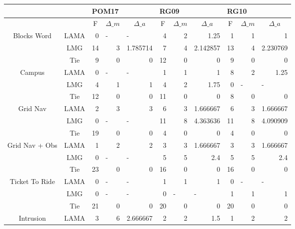 \documentclass{article}
\begin{document}
\begin{table}[htbp]
\begin{tabular}{|c|c|r|r|r|r|r|r|r|r|r|}
\hline
&&\multicolumn{3}{|l|}{POM17}&\multicolumn{3}{|l|}{RG09}&\multicolumn{3}{|l|}{RG10} \\ \hline
&\multicolumn{1}{|l|}{} & \multicolumn{1}{c|}{F} & \multicolumn{1}{c|}{$\Delta\_m$} & \multicolumn{1}{c|}{$\Delta\_a$} & \multicolumn{1}{c|}{F} & \multicolumn{1}{c|}{$\Delta\_m$} & \multicolumn{1}{c|}{$\Delta\_a$} & \multicolumn{1}{c|}{F} & \multicolumn{1}{c|}{$\Delta\_m$} & \multicolumn{1}{c|}{$\Delta\_a$} \\ \hline
\multirow{3}{*}{Blocks Word} & LAMA & 0 & \multicolumn{1}{l|}{-} & \multicolumn{1}{l|}{-} & 4 & 2 & 1.25 & 1 & 1 & 1 \\
&LMG & 14 & 3 & 1.785714 & 7 & 4 & 2.142857 & 13 & 4 & 2.230769 \\
&Tie & 9 & 0 & 0 & 12 & 0 & 0 & 9 & 0 & 0 \\ \hline
\multirow{3}{*}{Campus} & LAMA & 0 & \multicolumn{1}{l|}{-} & \multicolumn{1}{l|}{-} & 1 & 1 & 1 & 8 & 2 & 1.25 \\
&LMG & 4 & 1 & 1 & 4 & 2 & 1.75 & 0 & \multicolumn{1}{l|}{-} & \multicolumn{1}{l|}{-} \\
&Tie & 12 & 0 & 0 & 11 & 0 & 0 & 8 & 0 & 0 \\ \hline
\multirow{3}{*}{Grid Nav} & LAMA & 2 & 3 & 3 & 6 & 3 & 1.666667 & 6 & 3 & 1.666667 \\
&LMG & 0 & \multicolumn{1}{l|}{-} & \multicolumn{1}{l|}{-} & 11 & 8 & 4.363636 & 11 & 8 & 4.090909 \\ 
&Tie & 19 & 0 & 0 & 4 & 0 & 0 & 4 & 0 & 0 \\ \hline
\multirow{3}{*}{Grid Nav + Obs} & LAMA & 1 & 2 & 2 & 3 & 3 & 1.666667 & 3 & 3 & 1.666667 \\
&LMG & 0 & \multicolumn{1}{l|}{-} & \multicolumn{1}{l|}{-} & 5 & 5 & 2.4 & 5 & 5 & 2.4 \\
&Tie & 23 & 0 & 0 & 16 & 0 & 0 & 16 & 0 & 0 \\ \hline
\multirow{3}{*}{Ticket To Ride} & LAMA & 0 & \multicolumn{1}{l|}{-} & \multicolumn{1}{l|}{-} & 1 & 1 & 1 & 0 & \multicolumn{1}{l|}{-} & \multicolumn{1}{l|}{-} \\
&LMG & 0 & \multicolumn{1}{l|}{-} & \multicolumn{1}{l|}{-} & 0 & \multicolumn{1}{l|}{-} & \multicolumn{1}{l|}{-} & 1 & 1 & 1 \\
&Tie & 21 & 0 & 0 & 20 & 0 & 0 & 20 & 0 & 0 \\ \hline
\multirow{3}{*}{Intrusion} & LAMA & 3 & 6 & 2.666667 & 2 & 2 & 1.5 & 1 & 2 & 2 \\

\end{tabular}
\end{table}
\end{document}
